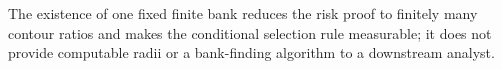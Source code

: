 The existence of one fixed finite bank reduces the risk proof to finitely many contour ratios and makes the conditional selection rule measurable; it does not provide computable radii or a bank-finding algorithm to a downstream analyst.